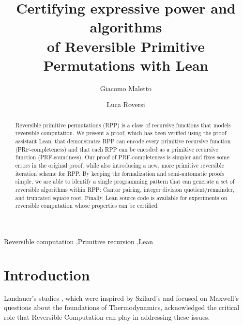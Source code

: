 \documentclass[preprint]{elsarticle}
\theoremstyle{remark}
\newcommand{\RPP}{\textsf{RPP}\xspace}
\newcommand{\PRF}{\textsf{PRF}\xspace}
\newcommand{\LEAN}{\textsf{Lean}\xspace}
\begin{document}
\begin{frontmatter}

\title{Certifying expressive power and algorithms\\  of Reversible Primitive Permutations with \LEAN}


\author[1]{Giacomo Maletto}

\author[2]{Luca Roversi}



\begin{abstract}
Reversible primitive permutations (\RPP) is a class of recursive functions that models reversible computation. We present a proof, which has been verified using the proof-assistant \LEAN, that demonstrates \RPP can encode every primitive recursive function (\PRF-completeness) and that each \RPP can be encoded as a primitive recursive function (\PRF-soundness). Our proof of \PRF-completeness is simpler and fixes some errors in the original proof, while also introducing a new, more primitive reversible iteration scheme for \RPP. By keeping the formalization and semi-automatic proofs simple, we are able to identify a single programming pattern that can generate a set of reversible algorithms within \RPP: Cantor pairing, integer division quotient/remainder, and truncated square root. Finally, \LEAN source code is available for experiments on reversible computation whose properties can be certified.
\end{abstract}

\begin{keyword}
    Reversible computation \sep Primitive recursion \sep Lean
\end{keyword}

\end{frontmatter}

\section{Introduction}
\label{section:Introduction}
Landauer's studies \cite{5392446,doi:10.1063/1.881299}, which were inspired by Szilard's \cite{Szilard1929berDE} and focused on Maxwell's \cite{maxwell1872theory} questions about the foundations of Thermodynamics, acknowledged the critical role that Reversible Computation can play in addressing these issues.
\end{document}
